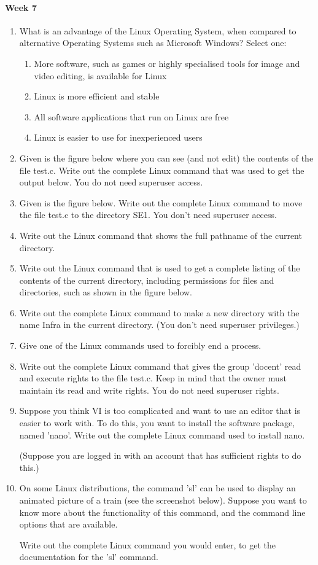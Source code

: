 \paragraph{Week 7}
\begin{enumerate}
    \item What is an advantage of the Linux Operating System, when compared to alternative Operating Systems such as Microsoft Windows?
    Select one:
    \begin{enumerate}
        \item More software, such as games or highly specialised tools for image and video editing, is available for Linux
        \item Linux is more efficient and stable
        \item All software applications that run on Linux are free
        \item Linux is easier to use for inexperienced users
    \end{enumerate}
    \item Given is the figure below where you can see (and not edit) the contents of the file test.c. Write out the complete Linux command that was used to get the output below. You do not need superuser access.
    \item Given is the figure below. Write out the complete Linux command to move the file test.c  to the directory SE1. You don't need superuser access.
    \item Write out the Linux command that shows the full pathname of the current directory.
    \item Write out the Linux command that is used to get a complete listing of the contents of the current directory, including permissions for files and directories, such as shown in the figure below.
    \item Write out the complete Linux command to make a new directory with the name Infra in the current directory. (You don't need superuser privileges.)
    \item Give one of the Linux commands used to forcibly end a process.
    \item Write out the complete Linux command that gives the group 'docent' read and execute rights to the file test.c. Keep in mind that the owner must maintain its read and write rights. You do not need superuser rights.
    \item Suppose you think VI is too complicated and want to use an editor that is easier to work with. To do this, you want to install the software package, named 'nano'. Write out the complete Linux command used to install nano.

    (Suppose you are logged in with an account that has sufficient rights to do this.)
    \item On some Linux distributions, the command 'sl' can be used to display an animated picture of a train (see the screenshot below). Suppose you want to know more about the functionality of this command, and the command line options that are available.

    Write out the complete Linux command you would enter, to get the documentation for the 'sl' command.
\end{enumerate}

